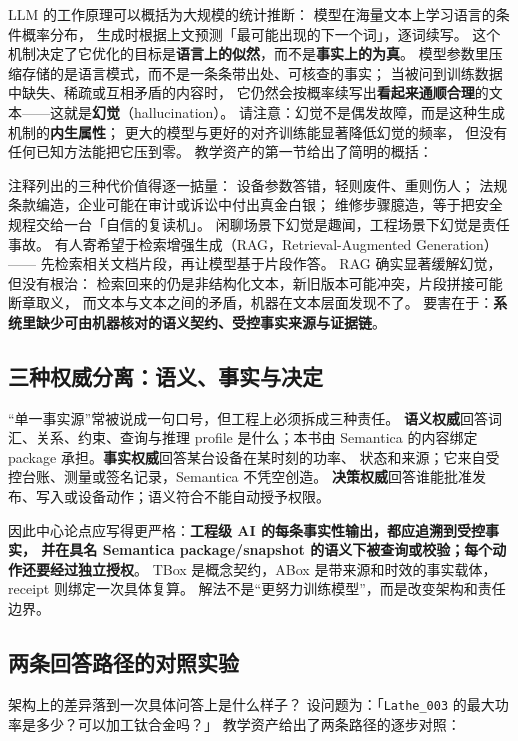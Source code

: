 LLM 的工作原理可以概括为大规模的统计推断：
模型在海量文本上学习语言的条件概率分布，
生成时根据上文预测「最可能出现的下一个词」，逐词续写。
这个机制决定了它优化的目标是\textbf{语言上的似然}，而不是\textbf{事实上的为真}。
模型参数里压缩存储的是语言模式，而不是一条条带出处、可核查的事实；
当被问到训练数据中缺失、稀疏或互相矛盾的内容时，
它仍然会按概率续写出\textbf{看起来通顺合理}的文本——这就是\textbf{幻觉}（hallucination）。
请注意：幻觉不是偶发故障，而是这种生成机制的\textbf{内生属性}；
更大的模型与更好的对齐训练能显著降低幻觉的频率，
但没有任何已知方法能把它压到零。
教学资产的第一节给出了简明的概括：



注释列出的三种代价值得逐一掂量：
设备参数答错，轻则废件、重则伤人；
法规条款编造，企业可能在审计或诉讼中付出真金白银；
维修步骤臆造，等于把安全规程交给一台「自信的复读机」。
闲聊场景下幻觉是趣闻，工程场景下幻觉是责任事故。
有人寄希望于检索增强生成（RAG，Retrieval-Augmented Generation）——
先检索相关文档片段，再让模型基于片段作答。
RAG 确实显著缓解幻觉，但没有根治：
检索回来的仍是非结构化文本，新旧版本可能冲突，片段拼接可能断章取义，
而文本与文本之间的矛盾，机器在文本层面发现不了。
要害在于：\textbf{系统里缺少可由机器核对的语义契约、受控事实来源与证据链}。

\subsection{三种权威分离：语义、事实与决定}

“单一事实源”常被说成一句口号，但工程上必须拆成三种责任。
\textbf{语义权威}回答词汇、关系、约束、查询与推理 profile 是什么；本书由
Semantica 的内容绑定 package 承担。\textbf{事实权威}回答某台设备在某时刻的功率、
状态和来源；它来自受控台账、测量或签名记录，Semantica 不凭空创造。
\textbf{决策权威}回答谁能批准发布、写入或设备动作；语义符合不能自动授予权限。

因此中心论点应写得更严格：\textbf{工程级 AI 的每条事实性输出，都应追溯到受控事实，
并在具名 Semantica package/snapshot 的语义下被查询或校验；每个动作还要经过独立授权}。
TBox 是概念契约，ABox 是带来源和时效的事实载体，receipt 则绑定一次具体复算。
解法不是“更努力训练模型”，而是改变架构和责任边界。

\subsection{两条回答路径的对照实验}

架构上的差异落到一次具体问答上是什么样子？
设问题为：「\texttt{Lathe\_003} 的最大功率是多少？可以加工钛合金吗？」
教学资产给出了两条路径的逐步对照：

